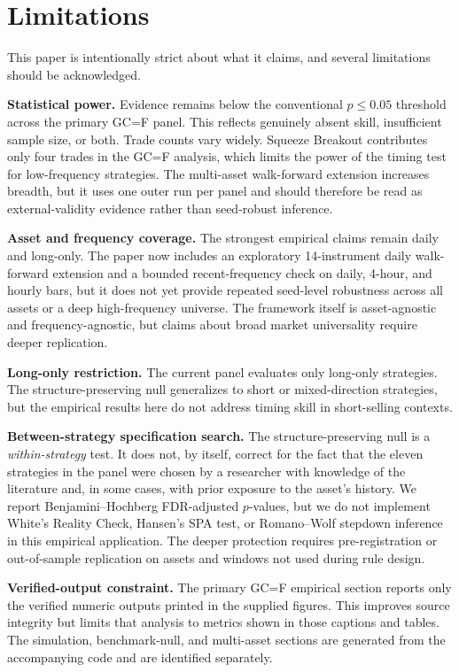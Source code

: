 \documentclass[preprint,12pt]{elsarticle}
\theoremstyle{definition}
\begin{document}
\section{Limitations}

This paper is intentionally strict about what it claims, and several limitations should be acknowledged.

\textbf{Statistical power.} Evidence remains below the conventional $p \le 0.05$ threshold across the primary GC=F panel. This reflects genuinely absent skill, insufficient sample size, or both. Trade counts vary widely. Squeeze Breakout contributes only four trades in the GC=F analysis, which limits the power of the timing test for low-frequency strategies. The multi-asset walk-forward extension increases breadth, but it uses one outer run per panel and should therefore be read as external-validity evidence rather than seed-robust inference.

\textbf{Asset and frequency coverage.} The strongest empirical claims remain daily and long-only. The paper now includes an exploratory 14-instrument daily walk-forward extension and a bounded recent-frequency check on daily, 4-hour, and hourly bars, but it does not yet provide repeated seed-level robustness across all assets or a deep high-frequency universe. The framework itself is asset-agnostic and frequency-agnostic, but claims about broad market universality require deeper replication.

\textbf{Long-only restriction.} The current panel evaluates only long-only strategies. The structure-preserving null generalizes to short or mixed-direction strategies, but the empirical results here do not address timing skill in short-selling contexts.

\textbf{Between-strategy specification search.} The structure-preserving null is a \emph{within-strategy} test. It does not, by itself, correct for the fact that the eleven strategies in the panel were chosen by a researcher with knowledge of the literature and, in some cases, with prior exposure to the asset's history. We report Benjamini--Hochberg FDR-adjusted $p$-values, but we do not implement White's Reality Check, Hansen's SPA test, or Romano--Wolf stepdown inference in this empirical application. The deeper protection requires pre-registration or out-of-sample replication on assets and windows not used during rule design.

\textbf{Verified-output constraint.} The primary GC=F empirical section reports only the verified numeric outputs printed in the supplied figures. This improves source integrity but limits that analysis to metrics shown in those captions and tables. The simulation, benchmark-null, and multi-asset sections are generated from the accompanying code and are identified separately.
\end{document}

